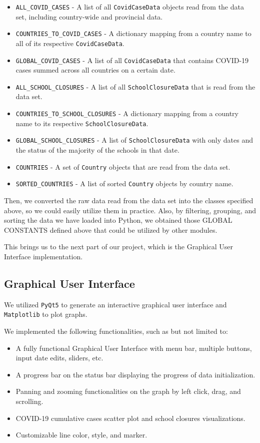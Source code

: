\documentclass[fontsize=11pt]{article}
\begin{document}
    \begin{itemize}
        \item \verb|ALL_COVID_CASES| - A list of all \verb|CovidCaseData| objects read from the data set, including country-wide and provincial data.
        \item \verb|COUNTRIES_TO_COVID_CASES| - A dictionary mapping from a country name to all of its respective \verb|CovidCaseData|.
        \item \verb|GLOBAL_COVID_CASES| - A list of all \verb|CovidCaseData| that contains COVID-19 cases summed across all countries on a certain date.
        \item \verb|ALL_SCHOOL_CLOSURES| - A list of all \verb|SchoolClosureData| that is read from the data set.
        \item \verb|COUNTRIES_TO_SCHOOL_CLOSURES| - A dictionary mapping from a country name to its respective \verb|SchoolClosureData|.
        \item \verb|GLOBAL_SCHOOL_CLOSURES| - A list of \verb|SchoolClosureData| with only dates and the status of the majority of the schools in that date.
        \item \verb|COUNTRIES| - A set of \verb|Country| objects that are read from the data set.
        \item \verb|SORTED_COUNTRIES| - A list of sorted \verb|Country| objects by country name.
    \end{itemize}

    Then, we converted the raw data read from the data set into the classes specified above, so we could easily utilize them in practice. Also, by filtering, grouping, and sorting the data we have loaded into Python, we obtained those GLOBAL CONSTANTS defined above that could be utilized by other modules.

    This brings us to the next part of our project, which is the Graphical User Interface implementation.

    \subsection{Graphical User Interface}

    We utilized \verb|PyQt5| to generate an interactive graphical user interface and \verb|Matplotlib| to plot graphs.

    We implemented the following functionalities, such as but not limited to:

    \begin{itemize}
        \item A fully functional Graphical User Interface with menu bar, multiple buttons, input date edits, sliders, etc.
        \item A progress bar on the status bar displaying the progress of data initialization.
        \item Panning and zooming functionalities on the graph by left click, drag, and scrolling.
        \item COVID-19 cumulative cases scatter plot and school closures visualizations.
        \item Customizable line color, style, and marker.
    \end{itemize}
\end{document}
